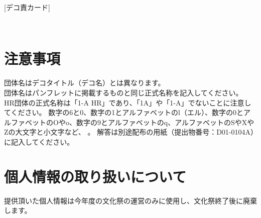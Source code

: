 \newpage
\pagestyle{booklet}
[デコ責カード]
\begin{multicols*}{2}
　\\
\vspace{-15mm}
\section{注意事項}
\indent 団体名はデコタイトル（デコ名）とは異なります。\\
\indent 団体名はパンフレットに掲載するものと同じ正式名称を記入してください。\\
HR団体の正式名称は「1-A HR」であり、「1A」や「1-A」でないことに注意してください。
\indent 数字の6と0、数字の1とアルファベットのl（エル）、数字の0とアルファベットのOやo、数字の9とアルファベットのq、アルファベットのSやXやZの大文字と小文字など、
。
\indent 解答は別途配布の用紙（提出物番号：D01-0104A）に記入してください。
\section{個人情報の取り扱いについて}
\indent 提供頂いた個人情報は今年度の文化祭の運営のみに使用し、文化祭終了後に廃棄します。

\end{multicols*}